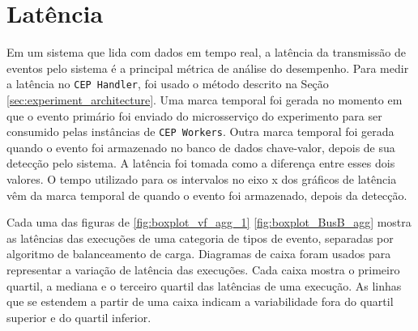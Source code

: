 \newpage
\section{Latência}
\label{sec:latency}









Em um sistema que lida com dados em tempo real, a latência da transmissão de eventos pelo sistema é a principal métrica de análise do desempenho. Para medir a latência no \texttt{CEP Handler}, foi usado o método descrito na Seção  \ref{sec:experiment_architecture}. Uma marca temporal foi gerada no momento em que o evento primário foi enviado do microsserviço do experimento para ser consumido pelas instâncias de \texttt{CEP Workers}. Outra marca temporal foi gerada quando o evento foi armazenado no banco de dados chave-valor, depois de sua detecção pelo sistema. A latência foi tomada como a diferença entre esses dois valores. O tempo utilizado para os intervalos no eixo x dos gráficos de latência vêm da marca temporal de quando o evento foi armazenado, depois da detecção. 

Cada uma das figuras de \ref{fig:boxplot_vf_agg_1} \ref{fig:boxplot_BusB_agg} mostra as latências das execuções de uma categoria de tipos de evento, separadas por algoritmo de balanceamento de carga. Diagramas de caixa foram usados para representar a variação de latência das execuções. Cada caixa mostra o primeiro quartil, a mediana e o terceiro quartil das latências de uma execução.  As linhas que se estendem a partir de uma caixa indicam a variabilidade fora do quartil superior e do quartil inferior.  %

